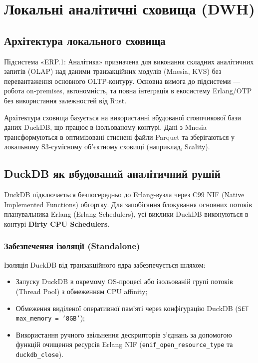 \chapter{Локальні аналітичні сховища (DWH)}

\section{Архітектура локального сховища}
Підсистема «ERP.1: Аналітика» призначена для виконання складних аналітичних запитів (OLAP) над даними транзакційних модулів (Mnesia, KVS) без перевантаження основного OLTP-контуру. Основна вимога до підсистеми --- робота on-premises, автономність, та повна інтеграція в екосистему Erlang/OTP без використання залежностей від Rust.

Архітектура сховища базується на використанні вбудованої стовпчикової бази даних DuckDB, що працює в ізольованому контурі. Дані з Mnesia трансформуються в оптимізовані стиснені файли Parquet та зберігаються у локальному S3-сумісному об'єктному сховищі (наприклад, Scality).

\section{DuckDB як вбудований аналітичний рушій}
DuckDB підключається безпосередньо до Erlang-вузла через C99 NIF (Native Implemented Functions) обгортку. Для запобігання блокування основних потоків планувальника Erlang (Erlang Schedulers), усі виклики DuckDB виконуються в контурі \textbf{Dirty CPU Schedulers}.

\subsection{Забезпечення ізоляції (Standalone)}
Ізоляція DuckDB від транзакційного ядра забезпечується шляхом:
\begin{itemize}
    \item Запуску DuckDB в окремому OS-процесі або ізольованій групі потоків (Thread Pool) з обмеженням CPU affinity;
    \item Обмеження виділеної оперативної пам'яті через конфігурацію DuckDB (\texttt{SET max\_memory = '8GB'});
    \item Використання ручного звільнення дескрипторів з'єднань за допомогою функцій очищення ресурсів Erlang NIF (\texttt{enif\_open\_resource\_type} та \texttt{duckdb\_close}).
\end{itemize}

